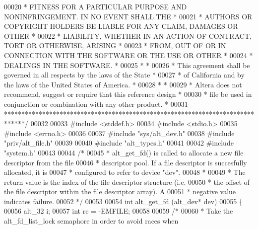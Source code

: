 \begin{DoxyCode}
00020 \textcolor{comment}{* FITNESS FOR A PARTICULAR PURPOSE AND NONINFRINGEMENT. IN NO EVENT SHALL THE *}
00021 \textcolor{comment}{* AUTHORS OR COPYRIGHT HOLDERS BE LIABLE FOR ANY CLAIM, DAMAGES OR OTHER      *}
00022 \textcolor{comment}{* LIABILITY, WHETHER IN AN ACTION OF CONTRACT, TORT OR OTHERWISE, ARISING     *}
00023 \textcolor{comment}{* FROM, OUT OF OR IN CONNECTION WITH THE SOFTWARE OR THE USE OR OTHER         *}
00024 \textcolor{comment}{* DEALINGS IN THE SOFTWARE.                                                   *}
00025 \textcolor{comment}{*                                                                             *}
00026 \textcolor{comment}{* This agreement shall be governed in all respects by the laws of the State   *}
00027 \textcolor{comment}{* of California and by the laws of the United States of America.              *}
00028 \textcolor{comment}{*                                                                             *}
00029 \textcolor{comment}{* Altera does not recommend, suggest or require that this reference design    *}
00030 \textcolor{comment}{* file be used in conjunction or combination with any other product.          *}
00031 \textcolor{comment}{******************************************************************************/}
00032 
00033 \textcolor{preprocessor}{#include <stddef.h>}
00034 \textcolor{preprocessor}{#include <stdio.h>}
00035 \textcolor{preprocessor}{#include <errno.h>}
00036 
00037 \textcolor{preprocessor}{#include "sys/alt_dev.h"}
00038 \textcolor{preprocessor}{#include "priv/alt_file.h"}
00039 
00040 \textcolor{preprocessor}{#include "alt_types.h"}
00041 
00042 \textcolor{preprocessor}{#include "system.h"}
00043 
00044 \textcolor{comment}{/*}
00045 \textcolor{comment}{ * alt\_get\_fd() is called to allocate a new file descriptor from the file}
00046 \textcolor{comment}{ * descriptor pool. If a file descriptor is succesfully allocated, it is }
00047 \textcolor{comment}{ * configured to refer to device "dev".}
00048 \textcolor{comment}{ *}
00049 \textcolor{comment}{ * The return value is the index of the file descriptor structure (i.e. }
00050 \textcolor{comment}{ * the offset of the file descriptor within the file descriptor array). A}
00051 \textcolor{comment}{ * negative value indicates failure.}
00052 \textcolor{comment}{ */}
00053 
00054 \textcolor{keywordtype}{int} alt_get_fd (alt_dev* dev)
00055 \{
00056   alt_32 i;
00057   \textcolor{keywordtype}{int} rc = -EMFILE;
00058   
00059   \textcolor{comment}{/* }
00060 \textcolor{comment}{   * Take the alt\_fd\_list\_lock semaphore in order to avoid races when }

\end{DoxyCode}
